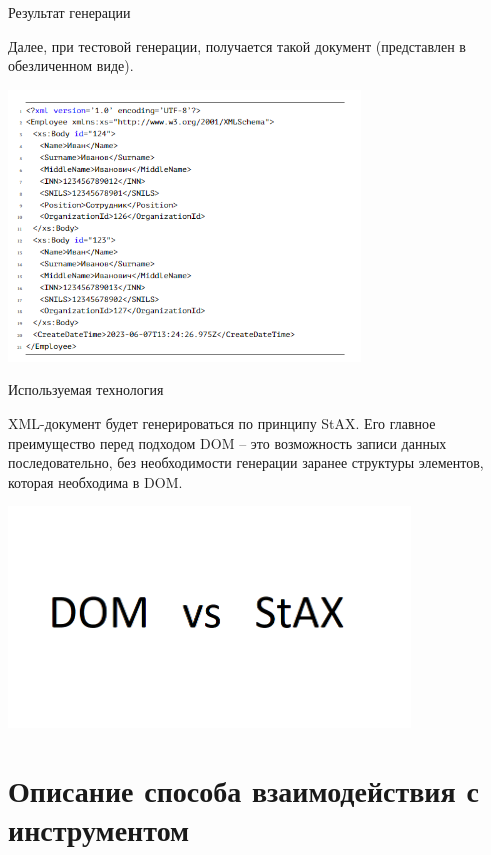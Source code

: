\documentclass[fullscreen=true,russian,compress,%
	hyperref={unicode,bookmarks=false}]{presentation}
\begin{document}
\begin{frame}{Результат генерации}

Далее, при тестовой генерации, получается такой документ (представлен в обезличенном виде).
\hfill
\centerline{\includegraphics[width=0.7\textwidth]{imgs/generatedexmaple.png}}
    
\end{frame}

\begin{frame}{Используемая технология}

XML-документ будет генерироваться по принципу StAX. Его главное преимущество перед подходом DOM -- это возможность записи данных последовательно, без необходимости генерации заранее структуры элементов, которая необходима в DOM. 
\hfill
\centerline{\includegraphics[width=0.8\textwidth]{imgs/staxvsdom.png}}
\end{frame}

\section{Описание способа взаимодействия с инструментом}
\end{document}
